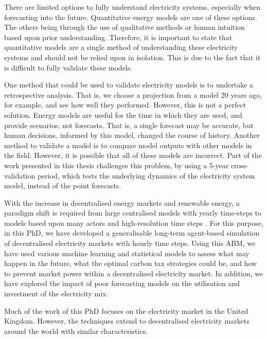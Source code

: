 There are limited options to fully understand electricity systems, especially when forecasting into the future. Quantitative energy models are one of these options. The others being through the use of qualitative methods or human intuition based upon prior understanding. Therefore, it is important to state that quantitative models are a single method of understanding these electricity systems and should not be relied upon in isolation. This is due to the fact that it is difficult to fully validate these models. 

One method that could be used to validate electricity models is to undertake a retrospective analysis. That is, we choose a projection from a model 20 years ago, for example, and see how well they performed. However, this is not a perfect solution. Energy models are useful for the time in which they are used, and provide scenarios; not forecasts. That is, a single forecast may be accurate, but human decisions, informed by this model, changed the course of history. Another method to validate a model is to compare model outputs with other models in the field. However, it is possible that all of these models are incorrect. Part of the work presented in this thesis challenges this problem, by using a 5-year cross-validation period, which tests the underlying dynamics of the electricity system model, instead of the point forecasts.

With the increase in decentralised energy markets and renewable energy, a paradigm shift is required from large centralised models with yearly time-steps to models based upon many actors and high-resolution time steps \cite{Pfenninger2014, Ringkjob2018}. For this purpose, in this PhD, we have developed a generalisable long-term agent-based simulation of decentralised electricity markets with hourly time steps. Using this \gls{ABM}, we have used various machine learning and statistical models to assess what may happen in the future, what the optimal carbon tax strategies could be, and how to prevent market power within a decentralised electricity market. In addition, we have explored the impact of poor forecasting models on the utilisation and investment of the electricity mix. 

Much of the work of this PhD focuses on the electricity market in the United Kingdom. However, the techniques extend to decentralised electricity markets around the world with similar characteristics. 









